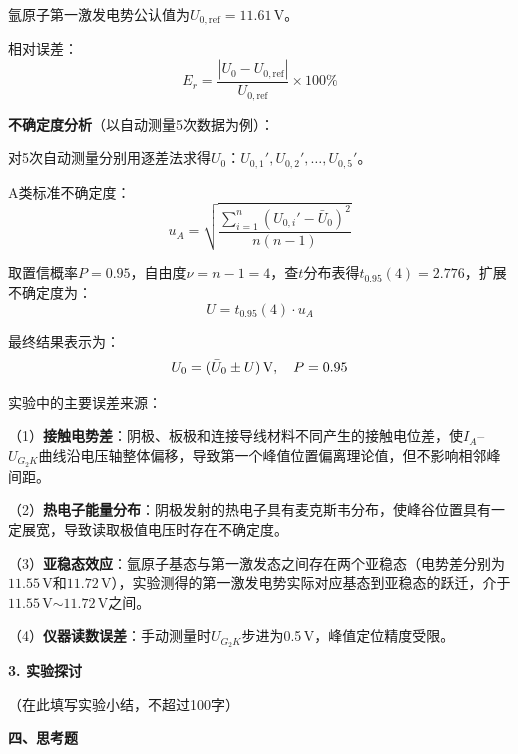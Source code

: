 \documentclass[a4paper,12pt]{article}
\begin{document}
{\fontsize{12pt}{18pt}\selectfont

氩原子第一激发电势公认值为$U_{0,\text{ref}} = 11.61$\,V。

相对误差：
\[
    E_r = \frac{|U_0 - U_{0,\text{ref}}|}{U_{0,\text{ref}}} \times 100\%
\]

\textbf{不确定度分析}（以自动测量5次数据为例）：

对5次自动测量分别用逐差法求得$U_0$：$U_{0,1}', U_{0,2}', \ldots, U_{0,5}'$。

A类标准不确定度：
\[
    u_A = \sqrt{\frac{\displaystyle\sum_{i=1}^{n}(U_{0,i}' - \bar{U}_0)^2}{n(n-1)}}
\]

取置信概率$P = 0.95$，自由度$\nu = n - 1 = 4$，查$t$分布表得$t_{0.95}(4) = 2.776$，扩展不确定度为：
\[
    U = t_{0.95}(4) \cdot u_A
\]

最终结果表示为：
\[
    U_0 = (\bar{U}_0 \pm U)\text{\,V}, \quad P = 0.95
\]

\vspace{0.3cm}

实验中的主要误差来源：

（1）\textbf{接触电势差}：阴极、板极和连接导线材料不同产生的接触电位差，使$I_A$--$U_{G_2K}$曲线沿电压轴整体偏移，导致第一个峰值位置偏离理论值，但不影响相邻峰间距。

（2）\textbf{热电子能量分布}：阴极发射的热电子具有麦克斯韦分布，使峰谷位置具有一定展宽，导致读取极值电压时存在不确定度。

（3）\textbf{亚稳态效应}：氩原子基态与第一激发态之间存在两个亚稳态（电势差分别为$11.55$\,V和$11.72$\,V），实验测得的第一激发电势实际对应基态到亚稳态的跃迁，介于$11.55$\,V$\sim$$11.72$\,V之间。

（4）\textbf{仪器读数误差}：手动测量时$U_{G_2K}$步进为0.5\,V，峰值定位精度受限。

}

\vspace{0.5cm}

{\fontsize{14pt}{20pt}\selectfont \textbf{3. 实验探讨}}

\vspace{0.3cm}

{\fontsize{12pt}{18pt}\selectfont

（在此填写实验小结，不超过100字）

}

\newpage

{\fontsize{16pt}{24pt}\selectfont \textbf{四、思考题}}

\vspace{0.5cm}
\end{document}
